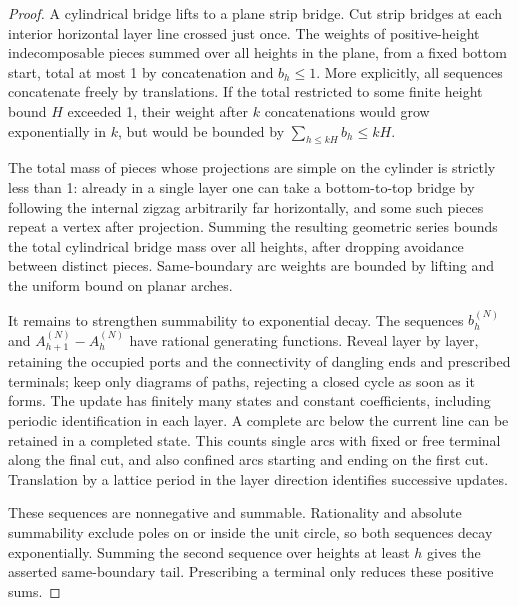 \begin{proof}
A cylindrical bridge lifts to a plane strip bridge. Cut strip bridges at each interior horizontal layer line crossed just once. The weights of positive-height indecomposable pieces summed over all heights in the plane, from a fixed bottom start, total at most 1 by concatenation and \(b_h\le1\). More explicitly, all sequences concatenate freely by translations. If the total restricted to some finite height bound \(H\) exceeded 1, their weight after \(k\) concatenations would grow exponentially in \(k\), but would be bounded by \(\sum_{h\le kH}b_h\le kH\).

The total mass of pieces whose projections are simple on the cylinder is strictly less than 1: already in a single layer one can take a bottom-to-top bridge by following the internal zigzag arbitrarily far horizontally, and some such pieces repeat a vertex after projection. Summing the resulting geometric series bounds the total cylindrical bridge mass over all heights, after dropping avoidance between distinct pieces. Same-boundary arc weights are bounded by lifting and the uniform bound on planar arches.

It remains to strengthen summability to exponential decay. The sequences \(b_h^{(N)}\) and \(A_{h+1}^{(N)}-A_h^{(N)}\) have rational generating functions. Reveal layer by layer, retaining the occupied ports and the connectivity of dangling ends and prescribed terminals; keep only diagrams of paths, rejecting a closed cycle as soon as it forms. The update has finitely many states and constant coefficients, including periodic identification in each layer. A complete arc below the current line can be retained in a completed state. This counts single arcs with fixed or free terminal along the final cut, and also confined arcs starting and ending on the first cut. Translation by a lattice period in the layer direction identifies successive updates.

These sequences are nonnegative and summable. Rationality and absolute summability exclude poles on or inside the unit circle, so both sequences decay exponentially. Summing the second sequence over heights at least \(h\) gives the asserted same-boundary tail. Prescribing a terminal only reduces these positive sums.
\end{proof}
